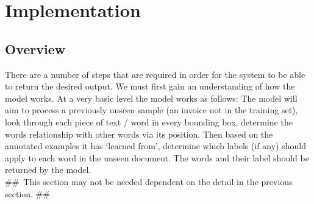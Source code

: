 \chapter{Implementation}
\label{chap3}
\label{sec:pipeline}
\section{Overview}
There are a number of steps that are required in order for the system to be able to return the desired output.
We must first gain an understanding of how the model works. At a very basic level the model works as follows:
\bigbreak
The model will aim to process a previously unseen sample (an invoice not in the training set), look through each piece of
text / word in every bounding box, determine the words relationship with other words via its position. Then based on the
annotated examples it has `learned from', determine which labels (if any) should apply to each word in the unseen
document. The words and their label should be returned by the model.\\
\#\#\ This section may not be needed dependent on the detail in the previous section. \#\#\

